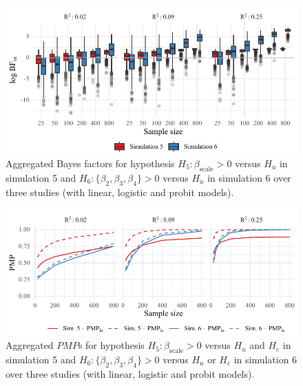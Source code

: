 \documentclass[
]{interact}
\begin{document}
                    \begin{figure}[!t]
                    
                    {\centering \includegraphics[width=1\textwidth,height=\textheight]{manuscript_VK_files/figure-pdf/fig-BF56-1.pdf}
                      
                    }
                    
                    \caption{\label{fig-BF56}Aggregated Bayes factors for hypothesis
                      \(H_5: \beta_{\text{scale}} > 0\) versus \(H_u\) in simulation 5 and
                      \(H_6: \{\beta_2, \beta_3, \beta_4\} > 0\) versus \(H_u\) in simulation
                      6 over three studies (with linear, logistic and probit models).}
                    
                    \end{figure}
                    
                    \begin{figure}[!t]
                    
                    {\centering \includegraphics[width=1\textwidth,height=\textheight]{manuscript_VK_files/figure-pdf/fig-PMP56-1.pdf}
                      
                    }
                    
                    \caption{\label{fig-PMP56}Aggregated \(PMP\)s for hypothesis
                      \(H_5: \beta_{\text{scale}} > 0\) versus \(H_u\) and \(H_c\) in
                      simulation 5 and \(H_6: \{\beta_2, \beta_3, \beta_4\} > 0\) versus
                      \(H_u\) or \(H_c\) in simulation 6 over three studies (with linear,
                                                                             logistic and probit models).}
                    
                    \end{figure}
                    
\end{document}
